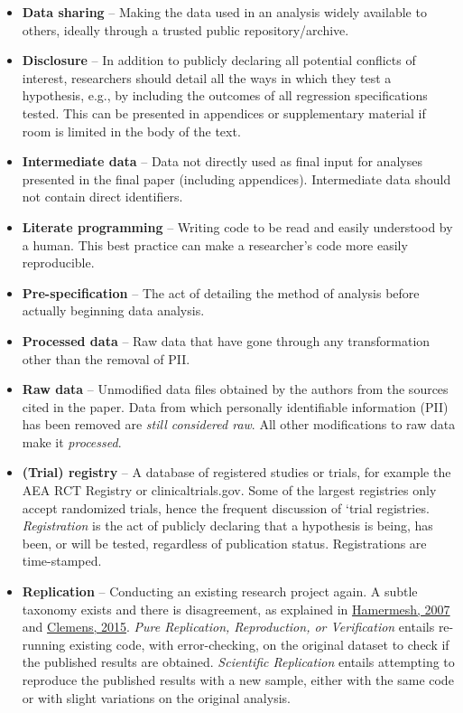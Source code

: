 \documentclass[]{book}
\begin{document}
\begin{itemize}
\item
  \textbf{Data sharing} -- Making the data used in an analysis widely available to others, ideally through a trusted public repository/archive.\\
\item
  \textbf{Disclosure} -- In addition to publicly declaring all potential conflicts of interest, researchers should detail all the ways in which they test a hypothesis, e.g., by including the outcomes of all regression specifications tested. This can be presented in appendices or supplementary material if room is limited in the body of the text.
\item
  \textbf{Intermediate data} -- Data not directly used as final input for analyses presented in the final paper (including appendices). Intermediate data should not contain direct identifiers.
\item
  \textbf{Literate programming} -- Writing code to be read and easily understood by a human. This best practice can make a researcher's code more easily reproducible.
\item
  \textbf{Pre-specification} -- The act of detailing the method of analysis before actually beginning data analysis.
\item
  \textbf{Processed data} -- Raw data that have gone through any transformation other than the removal of PII.\\
\item
  \textbf{Raw data} -- Unmodified data files obtained by the authors from the sources cited in the paper. Data from which personally identifiable information (PII) has been removed are \emph{still considered raw}. All other modifications to raw data make it \emph{processed}.\\
\item
  \textbf{(Trial) registry} -- A database of registered studies or trials, for example the AEA RCT Registry or clinicaltrials.gov. Some of the largest registries only accept randomized trials, hence the frequent discussion of `trial registries. \emph{Registration} is the act of publicly declaring that a hypothesis is being, has been, or will be tested, regardless of publication status. Registrations are time-stamped.
\item
  \textbf{Replication} -- Conducting an existing research project again. A subtle taxonomy exists and there is disagreement, as explained in \href{https://poseidon01.ssrn.com/delivery.php?ID=730022068104120012124069127117116094125005035067064043105083109027064120011088086109059117052062000025007012029080123125089014014006079063116014095000023071022077006017094093005117096083119073115079022110105075073085121117103030106102080005099007\&EXT=pdf}{Hamermesh, 2007} and \href{https://www.cgdev.org/sites/default/files/CGD-Working-Paper-399-Clemens-Meaning-Failed-Replications.pdf}{Clemens, 2015}. \emph{Pure Replication, Reproduction, or Verification} entails re-running existing code, with error-checking, on the original dataset to check if the published results are obtained. \emph{Scientific Replication} entails attempting to reproduce the published results with a new sample, either with the same code or with slight variations on the original analysis.

\end{itemize}
\end{document}
